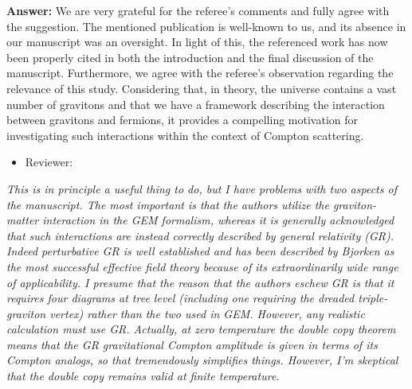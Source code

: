 \documentclass[11pt,superscriptaddress,aps,prd,preprint]{revtex4-2}
\begin{document}
\vspace{0.3cm}

{\bf Answer:} We are very grateful for the referee's comments and fully agree with the suggestion. The mentioned publication is well-known to us, and its absence in our manuscript was an oversight. In light of this, the referenced work has now been properly cited in both the introduction and the final discussion of the manuscript. Furthermore, we agree with the referee's observation regarding the relevance of this study. Considering that, in theory, the universe contains a vast number of gravitons and that we have a framework describing the interaction between gravitons and fermions, it provides a compelling motivation for investigating such interactions within the context of Compton scattering.  

\vspace{0.3cm}

\begin{itemize}
\item Reviewer:
\end{itemize}




{\it This is in principle a useful thing to do, but I have problems with two aspects of the manuscript. The most important is that the authors utilize the
	graviton-matter interaction in the GEM formalism, whereas it is generally
	acknowledged that such interactions are instead correctly described by general relativity (GR). Indeed perturbative GR is well established and has been
	described by Bjorken as the most successful effective field theory because of
	its extraordinarily wide range of applicability. I presume that the reason
	that the authors eschew GR is that it requires four diagrams at tree level
	(including one requiring the dreaded triple-graviton vertex) rather than the
	two used in GEM. However, any realistic calculation must use GR. Actually,
	at zero temperature the double copy theorem means that the GR gravitational Compton amplitude is given in terms of its Compton analogs, so that
	tremendously simplifies things. However, I’m skeptical that the double copy
	remains valid at finite temperature.}


\vspace{0.3cm}
\end{document}
